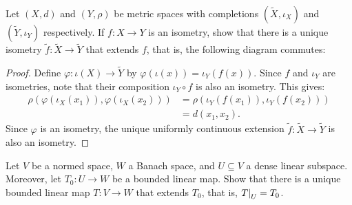 \documentclass[11pt,twoside,openany]{memoir}
\begin{document}
    \begin{exercise}
        Let $(X,d)$ and $(Y,\rho)$ be metric spaces with completions $(\widetilde{X},\iota_X)$ and $(\widetilde{Y},\iota_Y)$ respectively. If $f:X \rightarrow Y$ is an isometry, show that there is a unique isometry $\widetilde{f}:\widetilde{X} \rightarrow \widetilde{Y}$ that extends $f$, that is, the following diagram commutes:
            \begin{center}
            \end{center}
    \end{exercise}
        \begin{proof}
            Define $\varphi:\iota(X) \rightarrow \widetilde{Y}$ by $\varphi(\iota(x)) = \iota_Y(f(x))$. Since $f$ and $\iota_Y$ are isometries, note that their composition $\iota_Y \circ f$ is also an isometry. This gives:
                \begin{equation*}
                \begin{split}
                    \rho(\varphi(\iota_X(x_1)),\varphi(\iota_X(x_2)))
                    & = \rho(\iota_Y(f(x_1)),\iota_Y(f(x_2))) \\
                    & = d(x_1,x_2).
                \end{split}
                \end{equation*}
            Since $\varphi$ is an isometry,  the unique uniformly continuous extension $\widetilde{f}:\widetilde{X} \rightarrow \widetilde{Y}$ is also an isometry.
        \end{proof}
    \newpage
    \begin{exercise}
        Let $V$ be a normed space, $W$ a Banach space, and $U \subseteq V$ a dense linear subspace. Moreover, let $T_0:U \rightarrow W$ be a bounded linear map. Show that there is a unique bounded linear map $T:V \rightarrow W$ that extends $T_0$, that is, $\restr{T}{U} = T_0$.
    \end{exercise}
\end{document}
